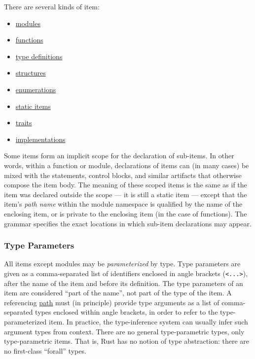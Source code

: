 \documentclass[]{article}
\begin{document}
There are several kinds of item:

\begin{itemize}
\itemsep1pt\parskip0pt
\item
  \hyperref[modules]{modules}
\item
  \hyperref[functions]{functions}
\item
  \hyperref[type-definitions]{type definitions}
\item
  \hyperref[structures]{structures}
\item
  \hyperref[enumerations]{enumerations}
\item
  \hyperref[static-items]{static items}
\item
  \hyperref[traits]{traits}
\item
  \hyperref[implementations]{implementations}
\end{itemize}

Some items form an implicit scope for the declaration of sub-items. In
other words, within a function or module, declarations of items can (in
many cases) be mixed with the statements, control blocks, and similar
artifacts that otherwise compose the item body. The meaning of these
scoped items is the same as if the item was declared outside the scope
--- it is still a static item --- except that the item's \emph{path
name} within the module namespace is qualified by the name of the
enclosing item, or is private to the enclosing item (in the case of
functions). The grammar specifies the exact locations in which sub-item
declarations may appear.

\subsubsection{Type Parameters}\label{type-parameters}

All items except modules may be \emph{parameterized} by type. Type
parameters are given as a comma-separated list of identifiers enclosed
in angle brackets (\texttt{\textless{}...\textgreater{}}), after the
name of the item and before its definition. The type parameters of an
item are considered ``part of the name'', not part of the type of the
item. A referencing \hyperref[paths]{path} must (in principle) provide
type arguments as a list of comma-separated types enclosed within angle
brackets, in order to refer to the type-parameterized item. In practice,
the type-inference system can usually infer such argument types from
context. There are no general type-parametric types, only
type-parametric items. That is, Rust has no notion of type abstraction:
there are no first-class ``forall'' types.
\end{document}

